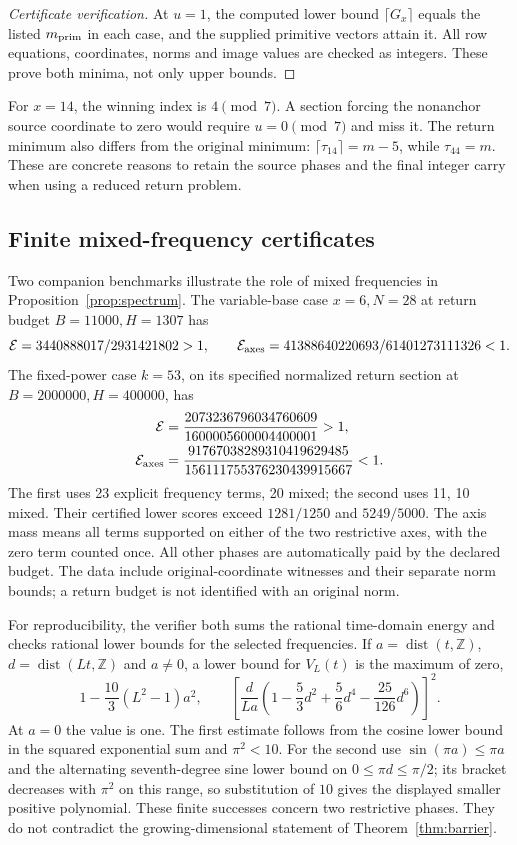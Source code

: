 \documentclass[11pt,a4paper]{article}
\theoremstyle{definition}\newtheorem{question}[theorem]{Question}
\theoremstyle{remark}\newtheorem{remark}[theorem]{Remark}
\newcommand{\Z}{\mathbb Z}\newcommand{\R}{\mathbb R}
\begin{document}
\begin{proof}[Certificate verification]
At $u=1$, the computed lower bound $\lceil G_x\rceil$ equals the
listed $m_{\mathrm{prim}}$ in each case, and the supplied primitive vectors attain
it. All row equations, coordinates, norms and image values are checked
as integers. These prove both minima, not only upper bounds.
\end{proof}

For $x=14$, the winning index is $4\pmod7$. A section forcing the
nonanchor source coordinate to zero would require $u=0\pmod7$ and
miss it. The return minimum also differs from the original minimum:
$\lceil\tau_{14}\rceil=m-5$, while $\tau_{44}=m$.
These are concrete reasons to retain the source phases and the final
integer carry when using a reduced return problem.

\subsection{Finite mixed-frequency certificates}
Two companion benchmarks illustrate the role of mixed frequencies
in Proposition~\ref{prop:spectrum}. The variable-base case
$x=6,N=28$ at return budget $B=11000,H=1307$ has
\[
 \mathcal E=3440888017/2931421802>1,
 \qquad\mathcal E_{\rm axes}=41388640220693/61401273111326<1.
\]
The fixed-power case $k=53$, on its specified normalized return
section at $B=2000000,H=400000$, has
\[
 \begin{aligned}
 \mathcal E&=\frac{2073236796034760609}{1600005600004400001}>1,\\
 \mathcal E_{\rm axes}
   &=\frac{91767038289310419629485}{156111755376230439915667}<1.
 \end{aligned}
\]
The first uses 23 explicit frequency terms, 20 mixed; the second
uses 11, 10 mixed. Their certified lower scores exceed $1281/1250$
and $5249/5000$. The axis mass means all terms supported on either
of the two restrictive axes, with the zero term counted once.
All other phases are automatically paid by the declared budget.
The data include original-coordinate witnesses and their separate
norm bounds; a return budget is not identified with an original norm.

For reproducibility, the verifier both sums the rational time-domain
energy and checks rational lower bounds for the selected frequencies.
If $a=\operatorname{dist}(t,\Z)$, $d=\operatorname{dist}(Lt,\Z)$
and $a\ne0$, a lower bound for $V_L(t)$ is the maximum of zero,
\[
 1-\frac{10}{3}(L^2-1)a^2,\qquad
 \left[\frac{d}{La}
 \left(1-\frac53d^2+\frac56d^4-\frac{25}{126}d^6\right)\right]^2.
\]
At $a=0$ the value is one. The first estimate follows from the
cosine lower bound in the squared exponential sum and $\pi^2<10$.
For the second use $\sin(\pi a)\le\pi a$ and the alternating
seventh-degree sine lower bound on $0\le\pi d\le\pi/2$;
its bracket decreases with $\pi^2$ on this range, so substitution
of $10$ gives the displayed smaller positive polynomial.
These finite successes concern two restrictive phases. They do not
contradict the growing-dimensional statement of Theorem~\ref{thm:barrier}.
\end{document}
